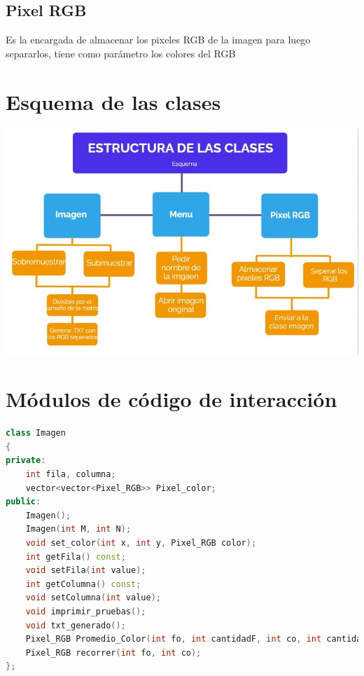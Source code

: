 \documentclass{article}
\begin{document}
\subsection{Pixel RGB}
Es la encargada de almacenar los pixeles RGB de la imagen para luego separarlos, tiene como parámetro los colores del RGB\\

\section{Esquema de las clases}
\includegraphics[width=14cm]{Imagenes/clases.jpeg}

\section{Módulos de código de interacción}

\begin{lstlisting}[language=C++, caption=Parámetros de la clase imagen]
class Imagen
{
private:
    int fila, columna;
    vector<vector<Pixel_RGB>> Pixel_color;
public:
    Imagen();
    Imagen(int M, int N);
    void set_color(int x, int y, Pixel_RGB color);  
    int getFila() const;
    void setFila(int value);
    int getColumna() const;
    void setColumna(int value);
    void imprimir_pruebas();
    void txt_generado();
    Pixel_RGB Promedio_Color(int fo, int cantidadF, int co, int cantidadC);
    Pixel_RGB recorrer(int fo, int co);
};
\end{lstlisting}
\end{document}
